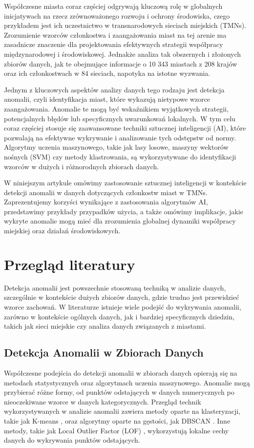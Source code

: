 \documentclass[a4paper,fleqn]{cas-dc}
\begin{document}
Współczesne miasta coraz częściej odgrywają kluczową rolę w globalnych inicjatywach na rzecz zrównoważonego rozwoju i ochrony środowiska, czego przykładem jest ich uczestnictwo w transnarodowych sieciach miejskich (TMNs). Zrozumienie wzorców członkostwa i zaangażowania miast na tej arenie ma zasadnicze znaczenie dla projektowania efektywnych strategii współpracy międzynarodowej i środowiskowej. Jednakże analiza tak obszernych i złożonych zbiorów danych, jak te obejmujące informacje o 10 343 miastach z 208 krajów oraz ich członkostwach w 84 sieciach, napotyka na istotne wyzwania.

Jednym z kluczowych aspektów analizy danych tego rodzaju jest detekcja anomalii, czyli identyfikacja miast, które wykazują nietypowe wzorce zaangażowania. Anomalie te mogą być wskaźnikiem wyjątkowych strategii, potencjalnych błędów lub specyficznych uwarunkowań lokalnych. W tym celu coraz częściej stosuje się zaawansowane techniki sztucznej inteligencji (AI), które pozwalają na efektywne wykrywanie i analizowanie tych odstępstw od normy. Algorytmy uczenia maszynowego, takie jak lasy losowe, maszyny wektorów nośnych (SVM) czy metody klastrowania, są wykorzystywane do identyfikacji wzorców w dużych i różnorodnych zbiorach danych.

W niniejszym artykule omówimy zastosowanie sztucznej inteligencji w kontekście detekcji anomalii w danych dotyczących członkostw miast w TMNs. Zaprezentujemy korzyści wynikające z zastosowania algorytmów AI, przedstawimy przykłady przypadków użycia, a także omówimy implikacje, jakie wykryte anomalie mogą mieć dla zrozumienia globalnej dynamiki współpracy miejskiej oraz działań środowiskowych.

\section{Przegląd literatury}

Detekcja anomalii jest powszechnie stosowaną techniką w analizie danych, szczególnie w kontekście dużych zbiorów danych, gdzie trudno jest przewidzieć wzorce zachowań. W literaturze istnieje wiele podejść do wykrywania anomalii, zarówno w kontekście ogólnych danych, jak i bardziej specyficznych dziedzin, takich jak sieci miejskie czy analiza danych związanych z miastami.

\subsection{Detekcja Anomalii w Zbiorach Danych} Współczesne podejścia do detekcji anomalii w zbiorach danych opierają się na metodach statystycznych oraz algorytmach uczenia maszynowego. Anomalie mogą przybierać różne formy, od punktów odstających w danych numerycznych po nieoczekiwane wzorce w danych kategorycznych. Przegląd technik wykorzystywanych w analizie anomalii zawiera metody oparte na klasteryzacji, takie jak K-means \citep{Lloyd1982}, oraz algorytmy oparte na gęstości, jak DBSCAN \citep{Ester1996}. Inne metody, takie jak Local Outlier Factor (LOF) \citep{Breunig2000}, wykorzystują lokalne cechy danych do wykrywania punktów odstających.
\end{document}
